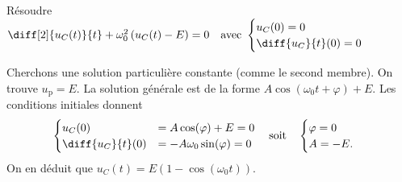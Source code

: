 

\finEntrainement





\hauteurLargeurCadreReponse		{8mm}{5.5cm}
\initialisationEntrainement

\debutEntrainement



\begin{enonce}
Résoudre $\diff[2]{u_C(t)}{t} + \omega_0^2\, (u_C(t)-E) = 0\quad\text{avec } 
\begin{cases}
u_C(0) = 0 \\
\diff{u_C}{t}(0) = 0
\end{cases}$
\end{enonce}


\begin{corrige}
Cherchons une solution particulière constante (comme le second membre). On trouve $u_\text{p}=E$. La solution générale est de la forme $A\cos(\omega_0t+\varphi)+E$. Les conditions initiales donnent
\[
\begin{cases}
u_C(0) 	&=A\cos(\varphi)+E=0\\
\diff{u_C}{t}(0)  &=-A\omega_0\sin(\varphi)= 0
\end{cases}
\quad\text{soit}\quad
\begin{cases}
\varphi =0\\
A =-E.
\end{cases}
\]
On en déduit que $u_C(t) = E (1 - \cos(\omega_0 t))$.
\end{corrige}

